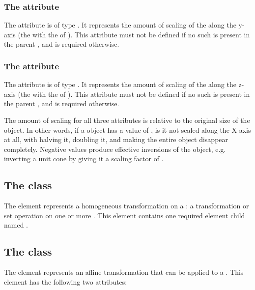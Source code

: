 \subsubsection{The \fixttspace{} attribute}
The  attribute is of type . It represents the amount of scaling of the \CSGNode along the y-axis (the \CoordinateComponent with the  of ).  This attribute must not be defined if no such \CoordinateComponent is present in the parent \Geometry, and is required otherwise.

\subsubsection{The \fixttspace{} attribute}
The  attribute is of type . It represents the amount of scaling of the \CSGNode along the z-axis (the \CoordinateComponent with the  of ).  This attribute must not be defined if no such \CoordinateComponent is present in the parent \Geometry, and is required otherwise.

The amount of scaling for all three attributes is relative to the original size of the object.  In other words, if a \CSGScale object has a  value of , is it not scaled along the X axis at all, with  halving it,  doubling it, and  making the entire object disappear completely.  Negative values produce effective inversions of the object, e.g. inverting a unit cone by giving it a  scaling factor of .


\subsection{The  class}
\label{csghomogeneoustransformation-class}
The \CSGHomogeneousTransformation element represents a homogeneous transformation on a \CSGNode: a transformation or set operation on one or more \CSGPrimitives. This element contains one required \TransformationComponent element child named .



\subsection{The  class}
\label{transformationcomponent-class}
The \TransformationComponent element represents an affine transformation that can be applied to a \CSGNode. This element has the following two attributes:

